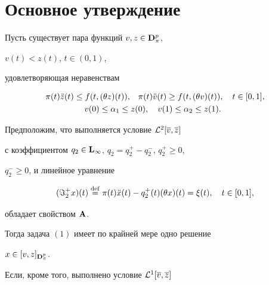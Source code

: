 \section{Основное утверждение}





\begin{thm}


Пусть существует пара функций $v,z\in\bold D_\pi^p$,


$v(t)< z(t)$, $t\in(0,1)$,


удовлетворяющая неравенствам


\begin{equation}


\begin{split}


\pi (t)\Ddot{z}(t)\le f(t,(\theta z)(t)),\quad


&\pi (t)\Ddot{v}(t)\ge f(t,(\theta v)(t)),\quad t\in [0,1], \\


v(0)\le\alpha_1\le z(&0), \quad v(1)\le\alpha_2\le z(1).


\end{split}


\end{equation}





Предположим, что выполняется условие ${\cal L}^2[\overline {v},\overline {z}]$


с коэффициентом $q_2\in\bold L_\infty$, $q_2=q_2^+-q_2^-$, $q_2^+\ge 0$,


$q_2^-\ge 0$, и линейное уравнение


\begin{equation}


({\Im}_2^+x)(t)


\overset{\mathrm{def}}{=}{}


\pi (t)\Ddot{x}(t)-q_2^+(t)(\theta x)(t)=\xi(t),\quad


t\in[0,1],


\end{equation}


обладает свойством $\bold A$.


Тогда задача $(1)$ имеет по крайней мере одно решение


$x\in[v,z]_{\bold D_\pi^p}$.





Если, кроме того, выполнено условие ${\cal L}^1[\overline {v},\overline {z}]$



\end{thm}
